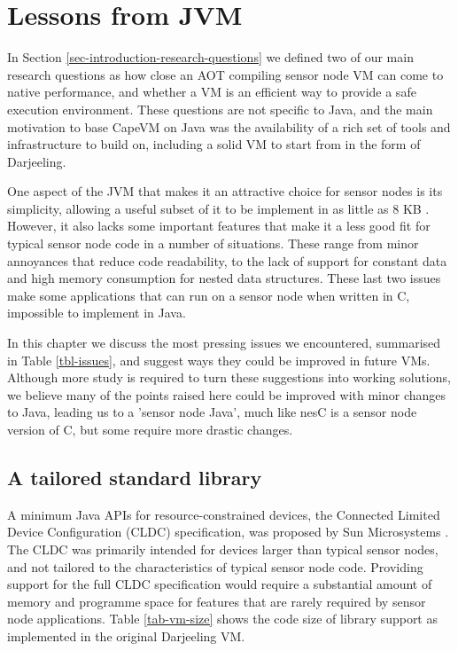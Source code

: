 \chapter{Lessons from JVM}



\label{sec-lessons-from-jvm}

In Section \ref{sec-introduction-research-questions} we defined two of our main research questions as how close an AOT compiling sensor node VM can come to native performance, and whether a VM is an efficient way to provide a safe execution environment. These questions are not specific to Java, and the main motivation to base CapeVM on Java was the availability of a rich set of tools and infrastructure to build on, including a solid VM to start from in the form of Darjeeling.

One aspect of the JVM that makes it an attractive choice for sensor nodes is its simplicity, allowing a useful subset of it to be implement in as little as 8 KB \cite{Harbaum}. However, it also lacks some important features that make it a less good fit for typical sensor node code in a number of situations. These range from minor annoyances that reduce code readability, to the lack of support for constant data and high memory consumption for nested data structures. These last two issues make some applications that can run on a sensor node when written in C, impossible to implement in Java.

In this chapter we discuss the most pressing issues we encountered, summarised in Table \ref{tbl-issues}, and suggest ways they could be improved in future VMs. Although more study is required to turn these suggestions into working solutions, we believe many of the points raised here could be improved with minor changes to Java, leading us to a 'sensor node Java', much like nesC \cite{Gay:2003up} is a sensor node version of C, but some require more drastic changes.

\section{A tailored standard library}
\label{sec-std-lib}

A minimum Java APIs for resource-constrained devices, the Connected Limited Device Configuration (CLDC) specification, was proposed by Sun Microsystems \cite{CLDC}. The CLDC was primarily intended for devices larger than typical sensor nodes, and not tailored to the characteristics of typical sensor node code. Providing support for the full CLDC specification would require a substantial amount of memory and programme space for features that are rarely required by sensor node applications. Table \ref{tab-vm-size} shows the code size of library support as implemented in the original Darjeeling VM.

